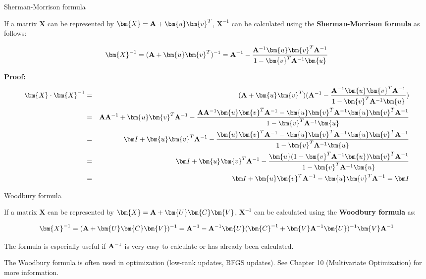 \begin{vbframe}{Sherman-Morrison formula}

If a matrix $\bm{X}$ can be represented by $\bm{X} = \Amat + \bm{u}\bm{v}^T$, $\bm{X}^{-1}$ can be calculated using the \textbf{Sherman-Morrison formula} as follows:

$$\bm{X}^{-1} = (\Amat + \bm{u}\bm{v}^T)^{-1} = \Amat^{-1} -  \frac{\Amat^{-1}\bm{u}\bm{v}^T\Amat^{-1}}{1-\bm{v}^T\Amat^{-1}\bm{u}}$$

\textbf{Proof:}
\vspace*{-.5cm}
\begin{eqnarray*}
\bm{X} \cdot \bm{X}^{-1} &=& (\Amat + \bm{u}\bm{v}^T) (\Amat^{-1} -  \frac{\Amat^{-1}\bm{u}\bm{v}^T\Amat^{-1}}{1-\bm{v}^T\Amat^{-1}\bm{u}}) \\ &=& \Amat\Amat^{-1} + \bm{u}\bm{v}^T \Amat^{-1} - \frac{\Amat\Amat^{-1}\bm{u}\bm{v}^T\Amat^{-1} - \bm{u}\bm{v}^T\Amat^{-1}\bm{u}\bm{v}^T\Amat^{-1}}{1-\bm{v}^T\Amat^{-1}\bm{u}}   \\
&=& \id + \bm{u}\bm{v}^T \Amat^{-1} - \frac{\bm{u}\bm{v}^T\Amat^{-1} - \bm{u}\bm{v}^T\Amat^{-1}\bm{u}\bm{v}^T\Amat^{-1}}{1-\bm{v}^T\Amat^{-1}\bm{u}}  \\ &=&  \id + \bm{u}\bm{v}^T \Amat^{-1} - \frac{\bm{u} (1 - \bm{v}^T\Amat^{-1}\bm{u}) \bm{v}^T\Amat^{-1}}{1-\bm{v}^T\Amat^{-1}\bm{u}}\\ &=& \id + \bm{u}\bm{v}^T\Amat^{-1} - \bm{u}\bm{v}^T\Amat^{-1} = \id
\end{eqnarray*}

\end{vbframe}

\begin{vbframe}{Woodbury formula}

If a matrix $\bm{X}$ can be represented by $\bm{X} = \Amat + \bm{U}\bm{C}\bm{V}$, $\bm{X}^{-1}$ can be calculated using the \textbf{Woodbury formula} as:

$$\bm{X}^{-1} = (\Amat + \bm{U}\bm{C}\bm{V})^{-1} = \Amat^{-1} - \Amat^{-1}\bm{U}(\bm{C}^{-1} + \bm{V}\Amat^{-1}\bm{U})^{-1}\bm{V}\Amat^{-1}$$

The formula is especially useful if $\mathbf{A}^{-1}$ is very easy to calculate or has already been calculated.

\lz

The Woodbury formula is often used in optimization (low-rank updates, BFGS updates). See Chapter 10 (Multivariate Optimization) for more information.


\end{vbframe}

\endlecture

